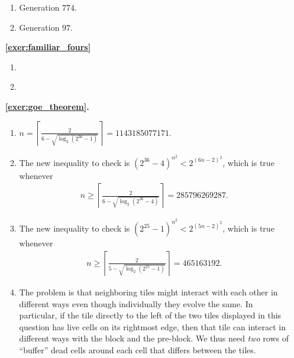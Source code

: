 \begin{multicols}{2}
\begin{itemize}[leftmargin=0em]
\begin{enumerate}[leftmargin=1.5em,label=\bf\color{ocre}(\alph*)]
			\item Generation $774$.
			
			\item Generation $97$. \\
		\end{enumerate}
	
	
		\item[\bf\color{ocre}\sffamily\ref{exer:familiar_fours}]
			\begin{enumerate}[leftmargin=1.5em,label=\bf\color{ocre}(\alph*)]
				\item {}
				
				\item {} \\
			\end{enumerate}
		
		
		\item[\bf\color{ocre}\sffamily\ref{exer:goe_theorem}.] \begin{enumerate}[leftmargin=1.5em,label=\bf\color{ocre}(\alph*)]
			\item $\displaystyle n =  \left\lceil \frac{2}{6-\sqrt{\log_2(2^{36}-1)}} \right\rceil = 1143185077171.$
		
			\item The new inequality to check is $(2^{36}-4)^{n^2} < 2^{(6n-2)^2}$, which is true whenever \begin{align*}n \geq \left\lceil \frac{2}{6-\sqrt{\log_2(2^{36}-4)}}\right\rceil = 285796269287.\end{align*}
			
			\item The new inequality to check is $(2^{25}-1)^{n^2} < 2^{(5n-2)^2}$, which is true whenever \begin{align*}n \geq \left\lceil \frac{2}{5-\sqrt{\log_2(2^{25}-1)}}\right\rceil = 465163192.\end{align*}
			
			\item The problem is that neighboring tiles might interact with each other in different ways even though individually they evolve the same. In particular, if the tile directly to the left of the two tiles displayed in this question has live cells on its rightmost edge, then that tile can interact in different ways with the block and the pre-block. We thus need \emph{two} rows of ``buffer'' dead cells around each cell that differs between the tiles.
		\end{enumerate}
	


\end{itemize}
\end{multicols}

